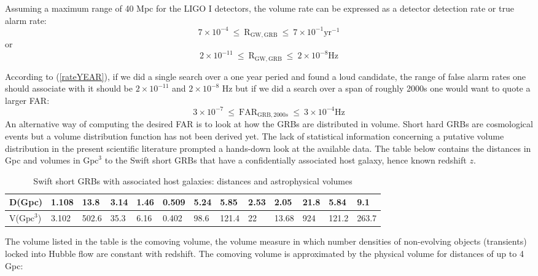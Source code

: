 \documentclass[epsf]{article}
\begin{document}
Assuming a maximum range of 40 Mpc for the LIGO I detectors, the volume rate can be expressed as a detector detection rate or true alarm rate:
%
\begin{equation}
7 \times 10^{-4} ~\leq~  \mathrm{R}_{\mathrm{GW},\mathrm{GRB}} ~\leq~  7 \times 10^{-1} \mathrm{yr^{-1}}
\end{equation}
%
or
%
\begin{equation}
\label{rateYEAR}
2 \times 10^{-11} ~\leq~  \mathrm{R}_{\mathrm{GW},\mathrm{GRB}} ~\leq~  2 \times 10^{-8} \mathrm{Hz}
\end{equation}
%

According to (\ref{rateYEAR}), if we did a single search over a one year peried and found a loud candidate, the range of false alarm rates one should associate with it should be $2 \times 10^{-11}$ and $2 \times 10^{-8}$ Hz but if we did a search over a span of roughly 2000s one would want to quote a larger FAR:
%
\begin{equation}
\label{rate2000s}
3 \times 10^{-7} ~\leq~  \mathrm{FAR}_{\mathrm{GRB},2000s} ~\leq~  3 \times 10^{-4} \mathrm{Hz}
\end{equation} 
%
An alternative way of computing the desired FAR is to look at how the GRBs are distributed in volume.
Short hard GRBs are cosmological events but a volume distribution function has not been derived yet. The lack of statistical information concerning a putative volume distribution in the present scientific literature prompted a hands-down look at the available data. The table below contains the distances in Gpc and volumes in $\mathrm{Gpc}^3$ to the Swift short GRBs that have a confidentially associated host galaxy, hence known redshift $z$.

\begin{table}[ht!]
 \begin{tabular}{|l|l|l|l|l|l|l|l|l|l|l|l|l|}
 \hline
 D(Gpc) & 1.108 & 13.8 & 3.14 & 1.46 & 0.509 & 5.24 & 5.85 & 2.53 & 2.05 & 21.8 & 5.84 & 9.1 \\
 \hline
 V($\mathrm{Gpc}^3$) & 3.102 & 502.6 & 35.3 & 6.16 & 0.402 & 98.6 & 121.4 & 22 & 13.68 & 924 & 121.2 & 263.7 \\
 \hline
\end{tabular} 
 \caption{Swift short GRBs with associated host galaxies: distances and astrophysical volumes}
 \label{Table 0}
\end{table}
  
The volume listed in the table is the comoving volume, the volume measure in which number densities of non-evolving objects (transients) locked into Hubble flow are constant with redshift. The comoving volume is approximated by the physical volume for distances of up to 4 Gpc:
\end{document}
